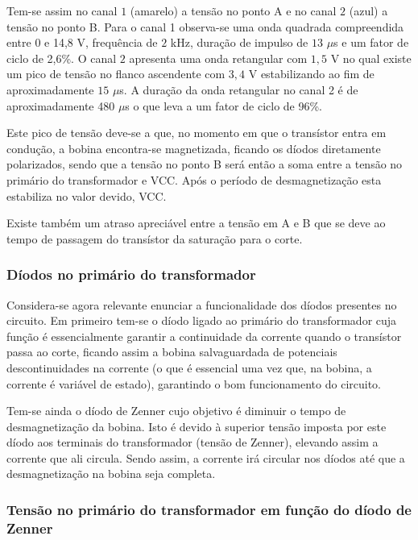 \documentclass[a4paper,11pt]{article}
\numberwithin{equation}{section}
\begin{document}
Tem-se assim no canal $1$ (amarelo) a tensão no ponto A e no canal $2$ (azul) a tensão no ponto B. Para o canal 1 observa-se uma onda quadrada compreendida entre 0 e 14,8 V, frequência de $2$ kHz, duração de impulso de $13$ $\mu$s e um fator de ciclo de 2,6\%. O canal $2$ apresenta uma onda retangular com $1,5$ V no qual existe um pico de tensão no flanco ascendente com $3,4$ V estabilizando ao fim de aproximadamente $15$ $\mu$s. A duração da onda retangular no canal 2 é de aproximadamente 480 $\mu$s o que leva a um fator de ciclo de 96\%. 

Este pico de tensão deve-se a que, no momento em que o transístor entra em condução, a bobina encontra-se magnetizada, ficando os díodos diretamente polarizados, sendo que a tensão no ponto B será então a soma entre a tensão no primário do transformador e VCC. Após o período de desmagnetização esta estabiliza no valor devido, VCC. 

Existe também um atraso apreciável entre a tensão em A e B que se deve ao tempo de passagem do transístor da saturação para o corte.

\subsubsection{Díodos no primário do transformador}

Considera-se agora relevante enunciar a funcionalidade dos díodos presentes no circuito. Em primeiro tem-se o díodo ligado ao primário do transformador cuja função é essencialmente garantir a continuidade da corrente quando o transístor passa ao corte, ficando assim a bobina salvaguardada de potenciais descontinuidades na corrente (o que é essencial uma vez que, na bobina, a corrente é variável de estado), garantindo o bom funcionamento do circuito. 

Tem-se ainda o díodo de Zenner cujo objetivo é diminuir o tempo de desmagnetização da bobina. Isto é devido à superior tensão imposta por este díodo aos terminais do transformador (tensão de Zenner), elevando assim a corrente que ali circula. Sendo assim, a corrente irá circular nos díodos até que a desmagnetização na bobina seja completa. 

\subsubsection{Tensão no primário do transformador em função do díodo de Zenner}
\end{document}
